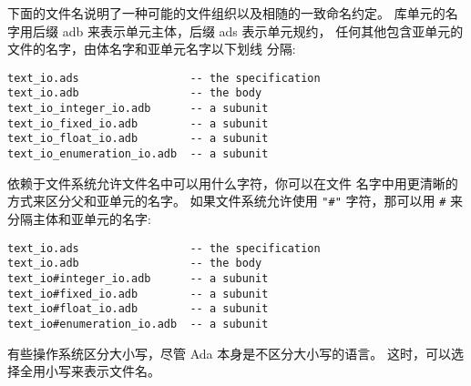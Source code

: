 \begin{blockindent}
下面的文件名说明了一种可能的文件组织以及相随的一致命名约定。
库单元的名字用后缀 adb 来表示单元主体，后缀 ads 表示单元规约，
任何其他包含亚单元的文件的名字，由体名字和亚单元名字以下划线
分隔:
\begin{lstlisting}
text_io.ads                 -- the specification
text_io.adb                 -- the body
text_io_integer_io.adb      -- a subunit
text_io_fixed_io.adb        -- a subunit
text_io_float_io.adb        -- a subunit
text_io_enumeration_io.adb  -- a subunit
\end{lstlisting}

依赖于文件系统允许文件名中可以用什么字符，你可以在文件
名字中用更清晰的方式来区分父和亚单元的名字。
如果文件系统允许使用 \texttt{"\#"} 字符，那可以用 \texttt{\#}
来分隔主体和亚单元的名字:
\begin{lstlisting}
text_io.ads                 -- the specification
text_io.adb                 -- the body
text_io#integer_io.adb      -- a subunit
text_io#fixed_io.adb        -- a subunit
text_io#float_io.adb        -- a subunit
text_io#enumeration_io.adb  -- a subunit
\end{lstlisting}

有些操作系统区分大小写，尽管 Ada 本身是不区分大小写的语言。
这时，可以选择全用小写来表示文件名。
\end{blockindent}

